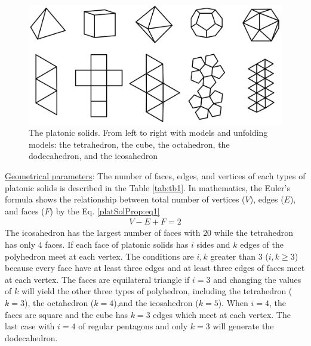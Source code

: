 \begin{figure}[h]
\centering
	\includegraphics[width=1\textwidth]{image/5Platonic1.png}
	\caption{The platonic solids. From left to right with models and unfolding models: the tetrahedron, the cube, the octahedron, the dodecahedron, and the icosahedron}
	\label{fig:platonicSolids}
\end{figure}
%
% 
%
%
%
\noindent \uline{Geometrical parameters}: 
The number of faces, edges, and vertices of each types of platonic solids is described in the Table \ref{tab:tb1}. 
In mathematics, the Euler's formula shows the relationship between total number of vertices ($V$), edges ($E$), and faces ($F$) by the Eq. \ref{platSolProp:eq1}
%
\begin{equation} 
\label{platSolProp:eq1}
\begin{split}
V-E+F=2
\end{split}
\end{equation}
% 
The icosahedron has the largest number of faces with $20$ while the tetrahedron has only $4$ faces. 
If each face of platonic solids has $i$ sides and $k$ edges of the polyhedron meet at each vertex.
The conditions are $i,k$ greater than $3$ ($i,k\geq3$) because every face have at least three edges and at least three edges of faces meet at each vertex.
The faces are equilateral triangle if $i=3$ and changing the values of $k$ will yield the other three types of polyhedron, including the tetrahedron ($k=3$), the octahedron ($k=4$),and the icosahedron ($k=5$). When $i=4$, the faces are square and the cube has $k=3$ edges which meet at each vertex. The last case with $i=4$ of regular pentagons and only $k=3$ will generate the dodecahedron. 
%
%
